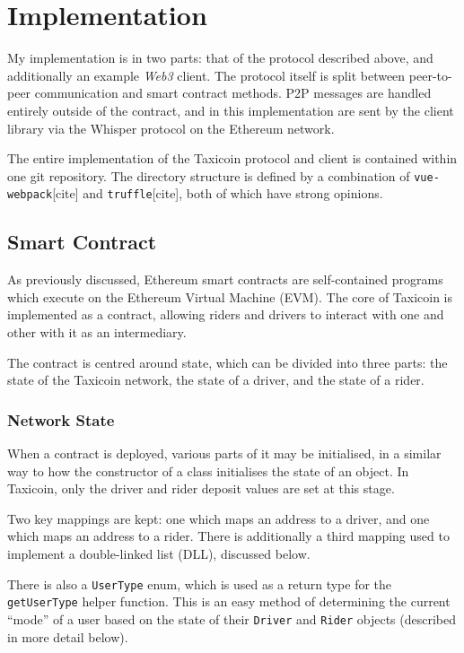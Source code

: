 \section{Implementation}

My implementation is in two parts: that of the protocol described above, and additionally an example \textit{Web3} client. The protocol itself is split between peer-to-peer communication and smart contract methods. P2P messages are handled entirely outside of the contract, and in this implementation are sent by the client library via the Whisper protocol on the Ethereum network.

The entire implementation of the Taxicoin protocol and client is contained within one git repository. The directory structure is defined by a combination of \lstinline{vue-webpack}[cite] and \lstinline{truffle}[cite], both of which have strong opinions. %

\subsection{Smart Contract}

As previously discussed, Ethereum smart contracts are self-contained programs which execute on the Ethereum Virtual Machine (EVM). The core of Taxicoin is implemented as a contract, allowing riders and drivers to interact with one and other with it as an intermediary.

The contract is centred around state, which can be divided into three parts: the state of the Taxicoin network, the state of a driver, and the state of a rider.

\subsubsection{Network State}

When a contract is deployed, various parts of it may be initialised, in a similar way to how the constructor of a class initialises the state of an object. In Taxicoin, only the driver and rider deposit values are set at this stage.

Two key mappings are kept: one which maps an address to a driver, and one which maps an address to a rider. There is additionally a third mapping used to implement a double-linked list (DLL), discussed below.

There is also a \lstinline{UserType} enum, which is used as a return type for the \lstinline{getUserType} helper function. This is an easy method of determining the current \enquote{mode} of a user based on the state of their \lstinline{Driver} and \lstinline{Rider} objects (described in more detail below).

